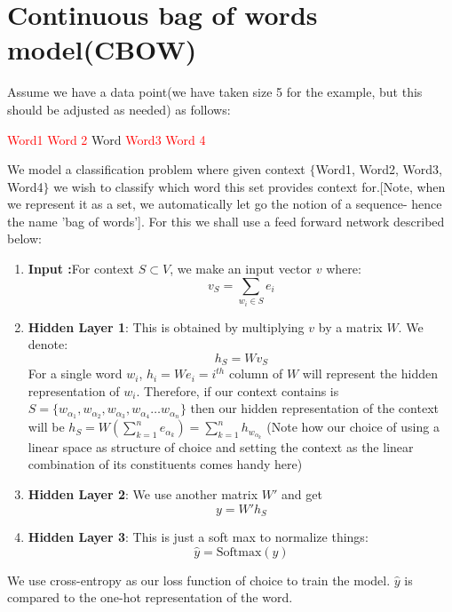 \section{Continuous bag of words model(CBOW)}
Assume we have a data point(we have taken size 5 for the example, but this should be adjusted as needed) as follows:
\begin{center}
    \textcolor{red}{Word1 Word 2} Word \textcolor{red}{Word3 Word 4}
\end{center} 
We model a classification problem where given context $\{$Word1, Word2, Word3, Word4$\}$ we wish to classify which word this set provides context for.[Note, when we represent it as a set, we automatically let go the notion of a sequence- hence the name 'bag of words']. For this we shall use a feed forward network described below:
\begin{enumerate}
    \item \textbf{Input :}For context $S\subset V$, we make an input vector $v$ where:
    $$v_S=\sum_{w_i\in S}e_i$$
    \item  \textbf{Hidden Layer 1}: This is obtained by multiplying $v$ by a matrix $W$. We denote:
    $$h_S=Wv_S$$
    For a single word $w_i$, $h_i=We_i=i^{th}$ column of $W$ will represent the hidden representation of $w_i$. 
    Therefore, if our context contains is $S=\{w_{\alpha_1},w_{\alpha_2},w_{\alpha_3},w_{\alpha_4}\hdots w_{\alpha_n}\}$ then our hidden representation of the context will be $h_S=W\left(\sum_{k=1}^n e_{\alpha_k}\right)=\sum_{k=1}^n h_{w_{\alpha_k}}$ (Note how our choice of using a linear space as structure of choice and setting the context as the linear combination of its constituents comes handy here)
    \item \textbf{Hidden Layer 2}: We use another matrix $W'$ and get
    $$y=W'h_S$$
    \item \textbf{Hidden Layer 3}: This is just a soft max to normalize things:
    $$\hat y=\text{Softmax}(y)$$
\end{enumerate} 
We use cross-entropy as our loss function of choice to train the model. $\hat y$ is compared to the one-hot representation of the word.

